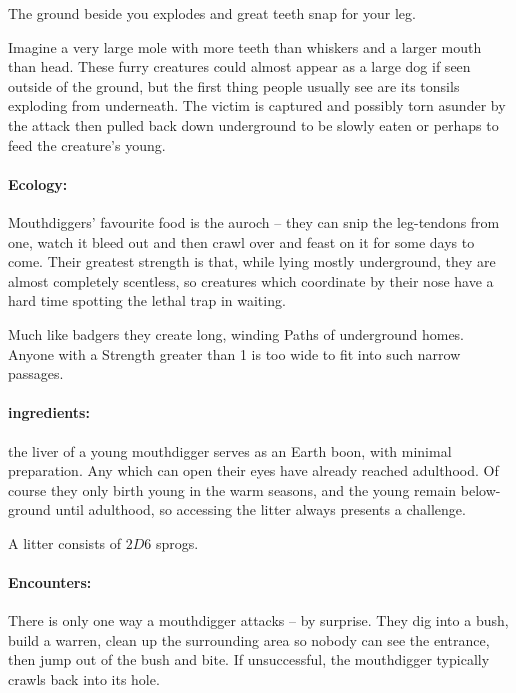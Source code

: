 \begin{multicols}{2}
\begin{boxtext}

  The ground beside you explodes and great teeth snap for your leg.

\end{boxtext}

Imagine a very large mole with more teeth than whiskers and a larger mouth than head.
These furry creatures could almost appear as a large dog if seen outside of the ground, but the first thing people usually see are its tonsils exploding from underneath.
The victim is captured and possibly torn asunder by the attack then pulled back down underground to be slowly eaten or perhaps to feed the creature's young.

\paragraph{Ecology:} Mouthdiggers' favourite food is the auroch -- they can snip the leg-tendons from one, watch it bleed out and then crawl over and feast on it for some days to come.
Their greatest strength is that, while lying mostly underground, they are almost completely scentless, so creatures which coordinate by their nose have a hard time spotting the lethal trap in waiting.

Much like badgers they create long, winding Paths of underground homes.  Anyone with a Strength greater than 1 is too wide to fit into such narrow passages.

\paragraph{\Glspl{ingredient}:}
the liver of a young mouthdigger serves as an Earth \gls{boon}, with minimal preparation.
Any which can open their eyes have already reached adulthood.
Of course they only birth young in the warm seasons, and the young remain below-ground until adulthood, so accessing the litter always presents a challenge.

A litter consists of $2D6$ sprogs.

\paragraph{Encounters:} There is only one way a mouthdigger attacks -- by surprise.  They dig into a bush, build a warren, clean up the surrounding area so nobody can see the entrance, then jump out of the bush and bite.  If unsuccessful, the mouthdigger typically crawls back into its hole.


\end{multicols}
